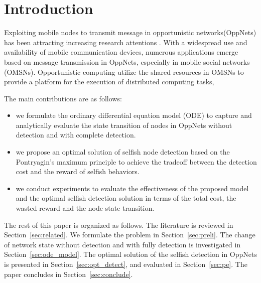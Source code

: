 \section{Introduction}
\label{sec:intro}
Exploiting mobile nodes to transmit message in
opportunistic networks(OppNets) has been attracting
increasing research attentions
\cite{DBLP:conf/sigcomm/SouzaMSMCC16,
DBLP:conf/infocom/LuSP16,
DBLP:conf/mobicom/RadenkovicH17,
DBLP:conf/infocom/SakaiSK19,
DBLP:journals/comsur/JedariXN18,
DBLP:journals/tmc/LoretiB20}.
With a widespread use and availability of
mobile communication devices, numerous applications
emerge based on message transmission in OppNets, especially 
in mobile social networks (OMSNs).
Opportunistic computing utilize the shared resources
in  OMSNs to provide a platform for the execution of
distributed computing tasks,

The main contributions are as follows:

\begin{itemize}
\item {we formulate the ordinary differential equation model (ODE)
to capture and analytically evaluate the state transition of nodes
in OppNets without detection and with complete detection.}
\item {we propose an optimal solution of selfish node detection
based on the Pontryagin's maximum principle
to achieve the tradeoff between the detection cost
and the reward of selfish behaviors.}
\item {we conduct experiments to evaluate
the effectiveness of the proposed model
and the optimal selfish detection solution 
in terms of the total cost, the wasted reward and the node state transition.}
\end{itemize}

The rest of this paper is organized as follows.
The literature is reviewed in Section~\ref{sec:related}.
We formulate the problem in Section~\ref{sec:preli}.
The change of network state without detection and with fully detection
is investigated in Section~\ref{sec:ode_model}.
The optimal solution of the selfish detection in OppNets
is presented in Section~\ref{sec:opt_detect},
and evaluated in Section~\ref{sec:pe}.
The paper concludes in Section~\ref{sec:conclude}.
